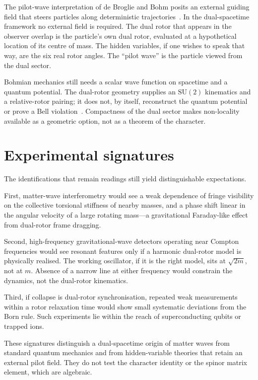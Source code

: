 \documentclass[a4paper]{article}
\begin{document}
The pilot-wave interpretation of de Broglie and Bohm posits an external guiding field that steers particles along deterministic trajectories~\cite{bohm1952}. In the dual-spacetime framework no external field is required. The dual rotor that appears in the observer overlap is the particle's own dual rotor, evaluated at a hypothetical location of its centre of mass. The hidden variables, if one wishes to speak that way, are the six real rotor angles. The ``pilot wave'' is the particle viewed from the dual sector.

Bohmian mechanics still needs a scalar wave function on spacetime and a quantum potential. The dual-rotor geometry supplies an \(\mathrm{SU}(2)\) kinematics and a relative-rotor pairing; it does not, by itself, reconstruct the quantum potential or prove a Bell violation~\cite{bell1964}. Compactness of the dual sector makes non-locality available as a geometric option, not as a theorem of the character.

\section{Experimental signatures}

The identifications that remain readings still yield distinguishable expectations.

First, matter-wave interferometry would see a weak dependence of fringe visibility on the collective torsional stiffness of nearby masses, and a phase shift linear in the angular velocity of a large rotating mass---a gravitational Faraday-like effect from dual-rotor frame dragging.

Second, high-frequency gravitational-wave detectors operating near Compton frequencies would see resonant features only if a harmonic dual-rotor model is physically realised. The working oscillator, if it is the right model, sits at \(\sqrt{2m}\), not at \(m\). Absence of a narrow line at either frequency would constrain the dynamics, not the dual-rotor kinematics.

Third, if collapse is dual-rotor synchronisation, repeated weak measurements within a rotor relaxation time would show small systematic deviations from the Born rule. Such experiments lie within the reach of superconducting qubits or trapped ions.

These signatures distinguish a dual-spacetime origin of matter waves from standard quantum mechanics and from hidden-variable theories that retain an external pilot field. They do not test the character identity or the spinor matrix element, which are algebraic.
\end{document}
